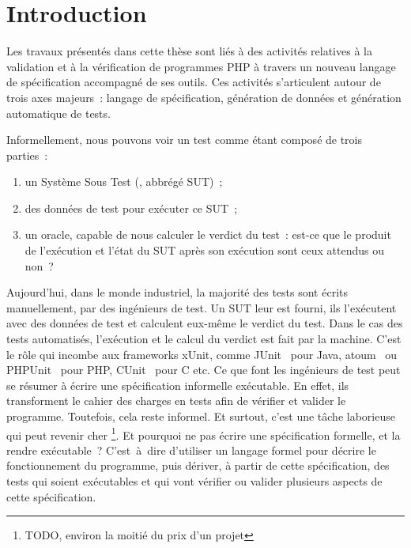 \chapter{Introduction}
\label{chapter:introduction}

\minitoc

Les travaux présentés dans cette thèse sont liés à des activités relatives à la
validation et à la vérification de programmes PHP à travers un nouveau langage
de spécification accompagné de ses outils. Ces activités s'articulent autour de
trois axes majeurs~: langage de spécification, génération de données et
génération automatique de tests.

Informellement, nous pouvons voir un test comme étant composé de trois parties~:

\begin{enumerate}

\item un Système Sous Test (, abbrégé {\strong
SUT})~;

\item des {\strong données de test} pour exécuter ce SUT~;

\item un {\strong oracle}, capable de nous calculer le verdict du test~: est-ce
que le produit de l'exécution et l'état du SUT après son exécution sont ceux
attendus ou non~?

\end{enumerate}

Aujourd'hui, dans le monde industriel, la majorité des tests sont écrits
{\strong manuellement}, par des ingénieurs de test. Un SUT leur est fourni, ils
l'exécutent avec des données de test et calculent eux-même le verdict du test.
Dans le cas des tests {\strong automatisés}, l'exécution et le calcul du verdict
est fait par la machine. C'est le rôle qui incombe aux frameworks xUnit, comme
JUnit~ pour Java, atoum~ ou PHPUnit~
pour PHP, CUnit~ pour C etc. Ce que font les ingénieurs de test
peut se résumer à écrire une spécification informelle exécutable. En effet, ils
transforment le cahier des charges en tests afin de vérifier et valider le
programme. Toutefois, cela reste informel. Et surtout, c'est une tâche
laborieuse qui peut revenir cher \footnote{TODO, environ la moitié du prix d'un
projet}. Et pourquoi ne pas écrire une spécification formelle, et la rendre
exécutable~?  C'est~à~dire d'utiliser un langage formel pour décrire le
fonctionnement du programme, puis dériver, à partir de cette spécification, des
tests qui soient exécutables et qui vont vérifier ou valider plusieurs aspects
de cette spécification. \\

